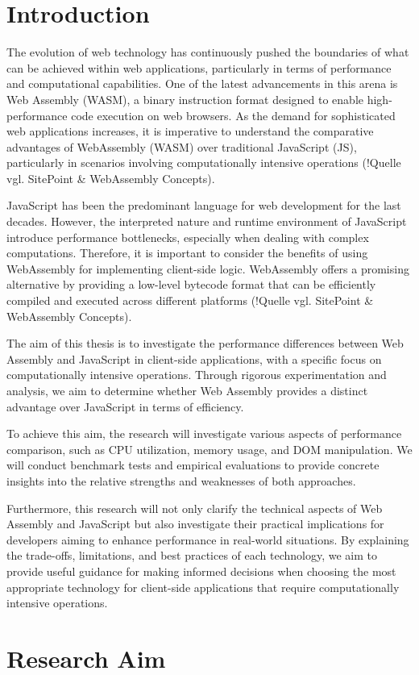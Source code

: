 \newpage

\section{Introduction} \label{introduction}
The evolution of web technology has continuously pushed the boundaries of what can be achieved within web applications, particularly in terms of performance and computational capabilities. One of the latest advancements in this arena is Web Assembly (WASM), a binary instruction format designed to enable high-performance code execution on web browsers. As the demand for sophisticated web applications increases, it is imperative to understand the comparative advantages of WebAssembly (WASM) over traditional JavaScript (JS), particularly in scenarios involving computationally intensive operations (!Quelle vgl. SitePoint &  WebAssembly Concepts).

JavaScript has been the predominant language for web development for the last decades. However, the interpreted nature and runtime environment of JavaScript introduce performance bottlenecks, especially when dealing with complex computations. Therefore, it is important to consider the benefits of using WebAssembly for implementing client-side logic. WebAssembly offers a promising alternative by providing a low-level bytecode format that can be efficiently compiled and executed across different platforms (!Quelle vgl. SitePoint &  WebAssembly Concepts).

The aim of this thesis is to investigate the performance differences between Web Assembly and JavaScript in client-side applications, with a specific focus on computationally intensive operations. Through rigorous experimentation and analysis, we aim to determine whether Web Assembly provides a distinct advantage over JavaScript in terms of efficiency.

To achieve this aim, the research will investigate various aspects of performance comparison, such as CPU utilization, memory usage, and DOM manipulation. We will conduct benchmark tests and empirical evaluations to provide concrete insights into the relative strengths and weaknesses of both approaches.

Furthermore, this research will not only clarify the technical aspects of Web Assembly and JavaScript but also investigate their practical implications for developers aiming to enhance performance in real-world situations. By explaining the trade-offs, limitations, and best practices of each technology, we aim to provide useful guidance for making informed decisions when choosing the most appropriate technology for client-side applications that require computationally intensive operations.

\section{Research Aim} \label{aim}

 \label{objectives}
